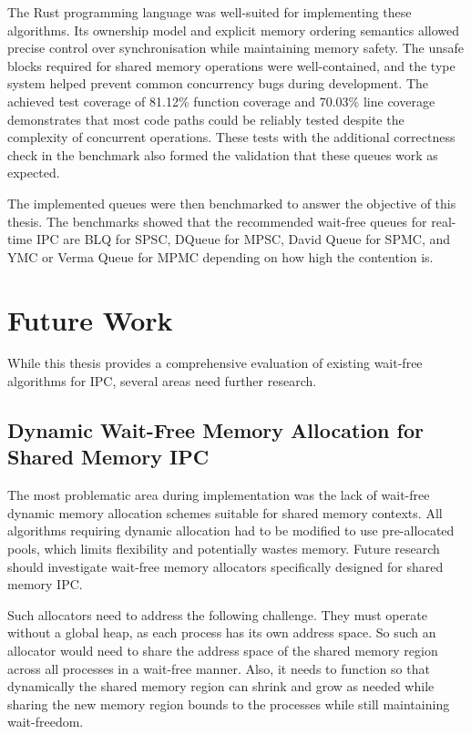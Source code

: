 The Rust programming language was well-suited for implementing these algorithms. Its ownership model and explicit memory ordering semantics allowed precise control over synchronisation while maintaining memory safety. The unsafe blocks required for shared memory operations were well-contained, and the type system helped prevent common concurrency bugs during development. The achieved test coverage of 81.12\% function coverage and 70.03\% line coverage demonstrates that most code paths could be reliably tested despite the complexity of concurrent operations. These tests with the additional correctness check in the benchmark also formed the validation that these queues work as expected.

The implemented queues were then benchmarked to answer the objective of this thesis. The benchmarks showed that the recommended wait-free queues for real-time \ac{IPC} are \acf{BLQ} for \ac{SPSC}, DQueue for \ac{MPSC}, David Queue for \ac{SPMC}, and \ac{YMC} or Verma Queue for \ac{MPMC} depending on how high the contention is.

\section{Future Work}
While this thesis provides a comprehensive evaluation of existing wait-free algorithms for \ac{IPC}, several areas need further research.

\subsection{Dynamic Wait-Free Memory Allocation for Shared Memory \acf{IPC}}
The most problematic area during implementation was the lack of wait-free dynamic memory allocation schemes suitable for shared memory contexts. All algorithms requiring dynamic allocation had to be modified to use pre-allocated pools, which limits flexibility and potentially wastes memory. Future research should investigate wait-free memory allocators specifically designed for shared memory \ac{IPC}.

Such allocators need to address the following challenge. They must operate without a global heap, as each process has its own address space. So such an allocator would need to share the address space of the shared memory region across all processes in a wait-free manner. Also, it needs to function so that dynamically the shared memory region can shrink and grow as needed while sharing the new memory region bounds to the processes while still maintaining wait-freedom.

